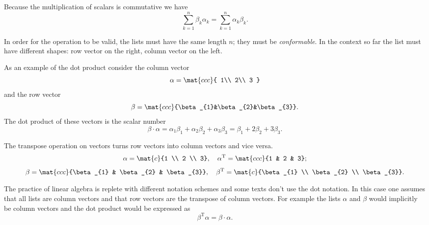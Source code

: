 Because the multiplication of scalars is commutative we have
\begin{equation}
  \sum_{k=1}^{n}{\beta_{k}\alpha_{k}} = \sum_{k=1}^{n}{\alpha_{k}\beta_{k}}.
  \label{eq:Icommute}
\end{equation}

In order for the operation to be valid, the lists must have the same length $n$; they must be \textit{conformable}. In the context so far the list must have different shapes: row vector on the right, column vector on the left.

As an example of the dot product consider the column vector
\begin{equation}
  \alpha = \mat{ccc}
  {
  1\\
  2\\
  3
  }
\end{equation}
and the row vector 
\begin{equation}
  \beta = \mat{ccc}{\beta_{1}&\beta_{2}&\beta_{3}}.
\end{equation}
The dot product of these vectors is the scalar number
\begin{equation}
  \beta \cdot \alpha = \alpha_{1}\beta_{1} + \alpha_{2}\beta_{2} + \alpha_{3}\beta_{3} = \beta_{1}+2\beta_{2}+3\beta_{3}.
\end{equation}

The transpose operation on vectors turns row vectors into column vectors and vice versa.
\begin{equation}
\begin{split}
  \alpha=\mat{c}{1 \\ 2 \\ 3}, \quad 
  \alpha^{\mathrm{T}} = \mat{ccc}{1 & 2 & 3};
\end{split}
\end{equation}
\begin{equation}
\begin{split}
  \beta=\mat{ccc}{\beta_{1} & \beta_{2} & \beta_{3}}, \quad 
  \beta^{\mathrm{T}} = \mat{c}{\beta_{1} \\ \beta_{2} \\ \beta_{3}}.
\end{split}
\end{equation}

The practice of linear algebra is replete with different notation schemes and some texts don't use the dot notation. In this case one assumes that all lists are column vectors and that row vectors are the transpose of column vectors. For example the lists $\alpha$ and $\beta$ would implicitly be column vectors and the dot product would be expressed as 
\begin{equation}
  \beta^{\mathrm{T}}\alpha = \beta \cdot \alpha.
\end{equation}

